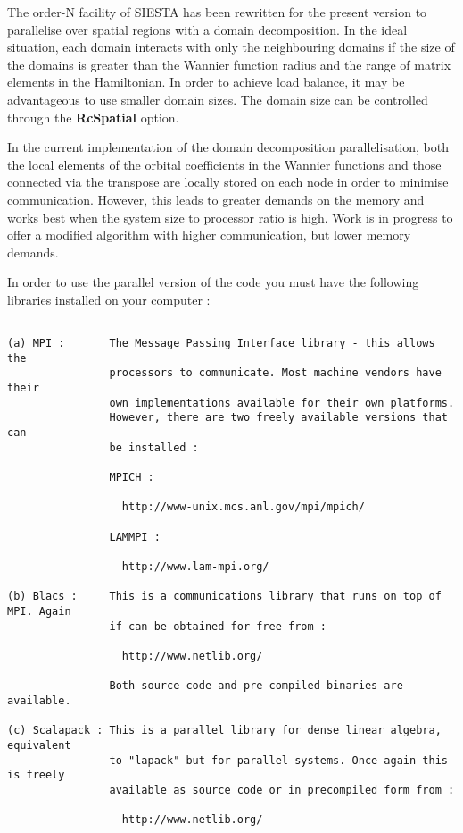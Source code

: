 \documentclass[11pt]{article}
\begin{document}
The order-N facility of SIESTA has been rewritten for the present version 
to parallelise over spatial regions with a domain decomposition. In the 
ideal situation, each domain interacts with only the neighbouring domains
if the size of the domains is greater than the Wannier function radius and
the range of matrix elements in the Hamiltonian. In order to achieve load
balance, it may be advantageous to use smaller domain sizes. The domain 
size can be controlled through the {\bf RcSpatial} option. 

In the current implementation of the domain decomposition parallelisation,
both the local elements of the orbital coefficients in the Wannier functions
and those connected via the transpose are locally stored on each node in order
to minimise communication. However, this leads to greater demands on the memory
and works best when the system size to processor ratio is high. Work is in 
progress to offer a modified algorithm with higher communication, but lower
memory demands. 

In order to use the parallel version of the code you must have the following
libraries installed on your computer :

\begin{verbatim}

(a) MPI :       The Message Passing Interface library - this allows the 
                processors to communicate. Most machine vendors have their 
                own implementations available for their own platforms. 
                However, there are two freely available versions that can 
                be installed :

                MPICH :

                  http://www-unix.mcs.anl.gov/mpi/mpich/

                LAMMPI :

                  http://www.lam-mpi.org/

(b) Blacs :     This is a communications library that runs on top of MPI. Again
                if can be obtained for free from :

                  http://www.netlib.org/

                Both source code and pre-compiled binaries are available.

(c) Scalapack : This is a parallel library for dense linear algebra, equivalent
                to "lapack" but for parallel systems. Once again this is freely
                available as source code or in precompiled form from :

                  http://www.netlib.org/

\end{verbatim}
\end{document}
